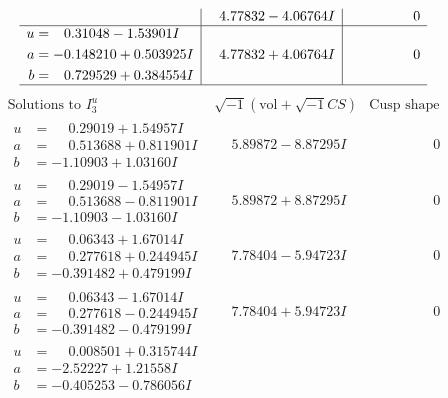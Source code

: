 \documentclass[1p]{elsarticle_modified}
\theoremstyle{definition}
\newcommand{\I}{\sqrt{-1}}
\begin{document}
$$\begin{array}{c|c|c}
 & \phantom{-}4.77832 - 4.06764 I & \phantom{-0.000000 } 0 \\ \hline\begin{aligned}
u &= \phantom{-}0.31048 - 1.53901 I \\
a &= -0.148210 + 0.503925 I \\
b &= \phantom{-}0.729529 + 0.384554 I\end{aligned}
 & \phantom{-}4.77832 + 4.06764 I & \phantom{-0.000000 } 0\\
 \hline 
 \end{array}$$\newpage$$\begin{array}{c|c|c}  
\text{Solutions to }I^u_{3}& \I (\text{vol} + \sqrt{-1}CS) & \text{Cusp shape}\\
 \hline 
\begin{aligned}
u &= \phantom{-}0.29019 + 1.54957 I \\
a &= \phantom{-}0.513688 + 0.811901 I \\
b &= -1.10903 + 1.03160 I\end{aligned}
 & \phantom{-}5.89872 - 8.87295 I & \phantom{-0.000000 } 0 \\ \hline\begin{aligned}
u &= \phantom{-}0.29019 - 1.54957 I \\
a &= \phantom{-}0.513688 - 0.811901 I \\
b &= -1.10903 - 1.03160 I\end{aligned}
 & \phantom{-}5.89872 + 8.87295 I & \phantom{-0.000000 } 0 \\ \hline\begin{aligned}
u &= \phantom{-}0.06343 + 1.67014 I \\
a &= \phantom{-}0.277618 + 0.244945 I \\
b &= -0.391482 + 0.479199 I\end{aligned}
 & \phantom{-}7.78404 - 5.94723 I & \phantom{-0.000000 } 0 \\ \hline\begin{aligned}
u &= \phantom{-}0.06343 - 1.67014 I \\
a &= \phantom{-}0.277618 - 0.244945 I \\
b &= -0.391482 - 0.479199 I\end{aligned}
 & \phantom{-}7.78404 + 5.94723 I & \phantom{-0.000000 } 0 \\ \hline\begin{aligned}
u &= \phantom{-}0.008501 + 0.315744 I \\
a &= -2.52227 + 1.21558 I \\
b &= -0.405253 - 0.786056 I\end{aligned}

\end{array}$$
\end{document}
